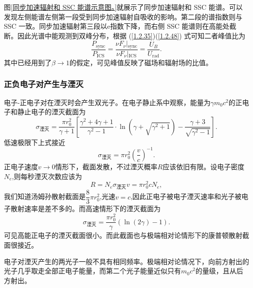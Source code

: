 \documentclass[../天体物理基础.tex]{subfiles}
\begin{document}
图\ref{同步加速辐射和 SSC 能谱示意图。}就展示了同步加速辐射和 SSC 能谱。可以发现左侧能谱左侧第一段受到同步加速辐射自吸收的影响。第二段的谱指数则与 SSC 一致。同步加速辐射第三段以$\mathrm{e}$指数下降，而右侧 SSC 能谱则在高能处截断。因此光谱中能观测到双峰分布，根据 (\ref{1.2.35})(\ref{1.2.48}) 式可知二者峰值比为
\begin{equation}
\frac{P_{\text{sync}}}{P_{\text{ICS}}}=\frac{\left.\nu F_{\nu}\right\vert{}_{\text{sync}}}{\left.\nu F_{\nu}\right\vert{}_{\text{ICS}}}=\frac{U_{B}}{U_{\text{rad}}}.
\end{equation}
其中已经用到了$\beta\to1$的假定，可见峰值反映了磁场和辐射场的比值。

\subsubsection{正负电子对产生与湮灭}
电子{}-{}正电子对在湮灭时会产生双光子。在电子静止系中观察，能量为$\gamma m_{0}c^{2}$的正电子和静止电子的湮灭截面为
\begin{equation}
\sigma_{\text{湮灭}}=\frac{\pi r_{0}^{2}}{\gamma+1}\left[\frac{\gamma^{2}+4\gamma+1}{\gamma^{2}-1}\cdot \ln\left(\gamma+\sqrt{\gamma^{2}+1}\right)-\frac{\gamma+3}{\sqrt{\gamma^{2}-1}}\right].
\end{equation}
低速极限下上式接近
\begin{equation}
\sigma_{\text{湮灭}}=\pi r_{0}^{2}\left(\frac{v}{c}\right)^{-1}.
\end{equation}
正电子速度$v\to0$情形下，截面发散，不过湮灭概率$R$应该依旧有限。设电子密度$N_{e}$,则每秒湮灭次数应该为
\begin{equation}
R=N_{e}\sigma_{\text{湮灭}}v=\pi r_{0}^{2}cN_{e},
\end{equation}
我们知道汤姆孙散射截面是$\dfrac{8}{3}\pi r_{0}^{2}$,光速$v=c$,因此正电子被电子湮灭速率和光子被电子散射速率是差不多的。而高速情形下的湮灭截面为
\begin{equation}
\sigma_{\text{湮灭}}=\frac{\pi r_{0}^{2}}{\gamma}\left(\ln\left(2\gamma\right)-1\right).
\end{equation}
可见高能正电子的湮灭截面很小。而此截面也与极端相对论情形下的康普顿散射截面很接近。

电子对湮灭产生的两光子一般不具有相同频率。极端相对论情况下，向前方射出的光子几乎取走全部正电子能量，而第二个光子能量近似只有$m_{0}c^{2}$的量级，且从后方射出。
\end{document}
